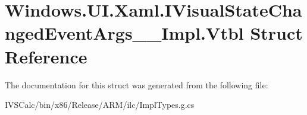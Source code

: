 \hypertarget{struct_windows_1_1_u_i_1_1_xaml_1_1_i_visual_state_changed_event_args_____impl_1_1_vtbl}{}\section{Windows.\+U\+I.\+Xaml.\+I\+Visual\+State\+Changed\+Event\+Args\+\_\+\+\_\+\+Impl.\+Vtbl Struct Reference}
\label{struct_windows_1_1_u_i_1_1_xaml_1_1_i_visual_state_changed_event_args_____impl_1_1_vtbl}


The documentation for this struct was generated from the following file\+:\begin{DoxyCompactItemize}
\item 
I\+V\+S\+Calc/bin/x86/\+Release/\+A\+R\+M/ilc/Impl\+Types.\+g.\+cs\end{DoxyCompactItemize}
